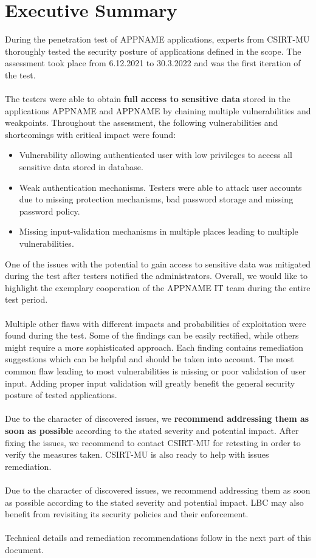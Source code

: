 \documentclass{article}
\begin{document}
\section{Executive Summary}
During the penetration test of APPNAME applications, experts from CSIRT-MU thoroughly tested the security posture of applications defined in the scope. The assessment took place from 6.12.2021 to 30.3.2022 and was the first iteration of the test.
\\
\\
The testers were able to obtain \textbf{full access to sensitive data} stored in the applications APPNAME and APPNAME by chaining multiple vulnerabilities and weakpoints. Throughout the assessment, the following vulnerabilities and shortcomings with critical impact were found:
\begin{itemize}
    \item Vulnerability allowing authenticated user with low privileges to access all sensitive data stored in database.
    \item Weak authentication mechanisms. Testers were able to attack user accounts due to missing protection mechanisms, bad password storage and missing password policy.
    \item Missing input-validation mechanisms in multiple places leading to multiple vulnerabilities.
\end{itemize}

One of the issues with the potential to gain access to sensitive data was mitigated during the test after testers notified the administrators. Overall, we would like to highlight the exemplary cooperation of the APPNAME IT team during the entire test period.
\\
\\
Multiple other flaws with different impacts and probabilities of exploitation were found during the test. Some of the findings can be easily rectified, while others might require a more sophisticated approach. Each finding contains remediation suggestions which can be helpful and should be taken into account. The most common flaw leading to most vulnerabilities is missing or poor validation of user input. Adding proper input validation will greatly benefit the general security posture of tested applications.
\\
\\
Due to the character of discovered issues, we \textbf{recommend addressing them as soon as possible} according to the stated severity and potential impact. After fixing the issues, we recommend to contact CSIRT-MU for retesting in order to verify the measures taken. CSIRT-MU is also ready to help with issues remediation.
\\
\\
Due to the character of discovered issues, we recommend addressing them as soon as possible according to the stated severity and potential impact.
LBC may also benefit from revisiting its security policies and their enforcement.\\
\\
Technical details and remediation recommendations follow in the next part of this document. 
\newpage
\end{document}
